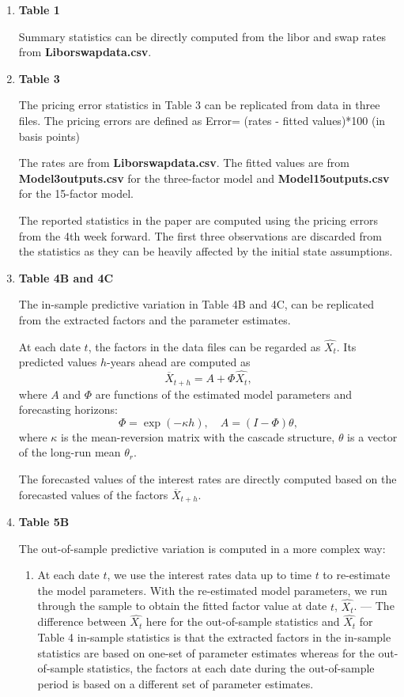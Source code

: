 \documentclass[11pt]{article}
\begin{document}
\begin{enumerate}
\item {\bf	Table 1}

Summary statistics can be directly computed from the libor and swap rates from  {\bf	Liborswapdata.csv}. 

\item {\bf	Table 3}

The pricing error statistics in Table 3 can be replicated from data in three files. The pricing errors are defined as 
Error= (rates -  fitted values)*100 (in basis points)

The rates are from {\bf	Liborswapdata.csv}. The fitted values are from {\bf	Model3outputs.csv} for the three-factor model and {\bf	Model15outputs.csv} for the 15-factor model.

The reported statistics in the paper are computed using the pricing errors from the 4th week forward. The first three observations are discarded from the statistics as they can be heavily affected by the initial state assumptions. 

\item {\bf	Table 4B and 4C}

The in-sample predictive variation in Table 4B and 4C, can be replicated from the extracted factors and the parameter estimates.

At each date $t$, the factors in the data files can be regarded as $\widehat{X_t}$. Its predicted values $h$-years ahead are computed as
\[
\overline{X}_{t+h}=A+\Phi \widehat{X_t},
\]
where $A$ and $\Phi$ are functions of the estimated model parameters and forecasting horizons:
\[
\Phi=\exp(-\kappa h),\quad A=(I-\Phi)\theta,
\]
where $\kappa$ is the mean-reversion matrix with the cascade structure, $\theta$ is a vector of the long-run mean $\theta_r$.

The forecasted values of the interest rates are directly computed based on the forecasted values of the factors $\overline{X}_{t+h}$.

\item {\bf	Table 5B}

The out-of-sample predictive variation is computed in a more complex way:
\begin{enumerate}
\item At each date $t$, we use the interest rates data up to time $t$ to re-estimate the model parameters. With the re-estimated model parameters, we run through the sample to obtain the fitted factor value at date $t$, $\widehat{X_t}$. --- The difference between $\widehat{X_t}$ here for the out-of-sample statistics  and $\widehat{X_t}$ for Table 4 in-sample statistics is that the extracted factors in the in-sample statistics are based on one-set of parameter estimates whereas for the out-of-sample statistics, the factors at each date during the out-of-sample period is based on a different set of parameter estimates. 



\end{enumerate}
\end{enumerate}
\end{document}
